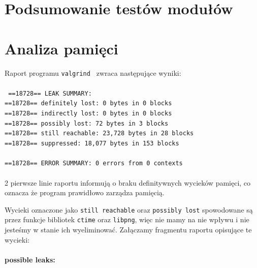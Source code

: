\documentclass{mwart}
\begin{document}

\section{Podsumowanie testów modułów}

\section{Analiza pamięci}
\noindent Raport programu \texttt{valgrind } zwraca następujące wyniki:\\\\
\noindent \texttt{\noindent 
==18728== LEAK SUMMARY:\\
==18728==    definitely lost: 0 bytes in 0 blocks\\
==18728==    indirectly lost: 0 bytes in 0 blocks\\
==18728==      possibly lost: 72 bytes in 3 blocks\\
==18728==    still reachable: 23,728 bytes in 28 blocks\\
==18728==         suppressed: 18,077 bytes in 153 blocks\\
\\
==18728== ERROR SUMMARY: 0 errors from 0 contexts 
}\\\\

2 pierwsze linie raportu informują o braku definitywnych wycieków pamięci, co oznacza że program prawidłowo zarządza pamięcią.

Wycieki oznaczone jako \texttt{still reachable} oraz \texttt{possibly lost} spowodowane są przez funkcje bibliotek \texttt{ctime} oraz \texttt{libpng}, więc nie mamy na nie wpływu i nie jesteśmy w stanie ich wyeliminować. Załączamy fragmentu raportu opisujące te wycieki:\\

\paragraph{possible leaks:} \mbox{}
\end{document}
